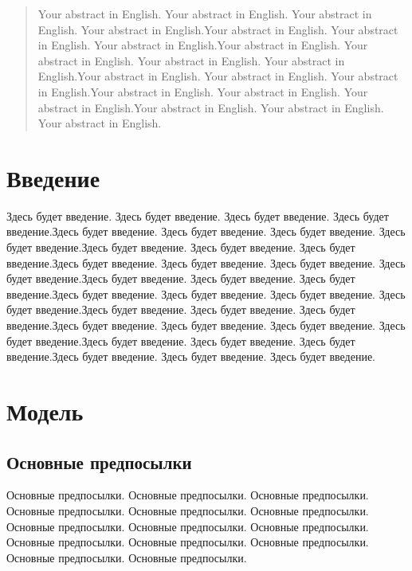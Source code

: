 \documentclass[12pt]{article}
\begin{document}
\begin{abstract}
Your abstract in English. Your abstract in English. Your abstract in English. Your abstract in English.Your abstract in English. Your abstract in English. Your abstract in English.Your abstract in English. Your abstract in English. Your abstract in English. Your abstract in English.Your abstract in English. Your abstract in English. Your abstract in English.Your abstract in English. Your abstract in English. Your abstract in English.Your abstract in English. Your abstract in English. Your abstract in English.
\end{abstract}


\newpage
{}
\tableofcontents

\newpage


\section{Введение}

\par Здесь будет введение. Здесь будет введение. Здесь будет введение. Здесь будет введение.Здесь будет введение. Здесь будет введение. Здесь будет введение. Здесь будет введение.Здесь будет введение. Здесь будет введение. Здесь будет введение.Здесь будет введение. Здесь будет введение. Здесь будет введение. Здесь будет введение.Здесь будет введение. Здесь будет введение. Здесь будет введение.Здесь будет введение. Здесь будет введение. Здесь будет введение. Здесь будет введение.Здесь будет введение. Здесь будет введение. Здесь будет введение.Здесь будет введение. Здесь будет введение. Здесь будет введение. Здесь будет введение.Здесь будет введение. Здесь будет введение. Здесь будет введение.Здесь будет введение. Здесь будет введение. Здесь будет введение.

\section{Модель}


\subsection{Основные предпосылки}

Основные предпосылки. Основные предпосылки.
Основные предпосылки.
Основные предпосылки.
Основные предпосылки.
Основные предпосылки.
Основные предпосылки.
Основные предпосылки.
Основные предпосылки.
Основные предпосылки.
Основные предпосылки.
Основные предпосылки.
Основные предпосылки.
Основные предпосылки.
\end{document}
